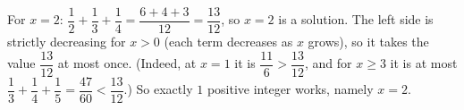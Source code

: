For $x=2$: $\dfrac12+\dfrac13+\dfrac14=\dfrac{6+4+3}{12}=\dfrac{13}{12}$, so $x=2$ is a solution. The left side is strictly decreasing for $x>0$ (each term decreases as $x$ grows), so it takes the value $\dfrac{13}{12}$ at most once. (Indeed, at $x=1$ it is $\dfrac{11}{6}>\dfrac{13}{12}$, and for $x\ge3$ it is at most $\dfrac13+\dfrac14+\dfrac15=\dfrac{47}{60}<\dfrac{13}{12}$.) So exactly $\boxed{1}$ positive integer works, namely $x=2$.
